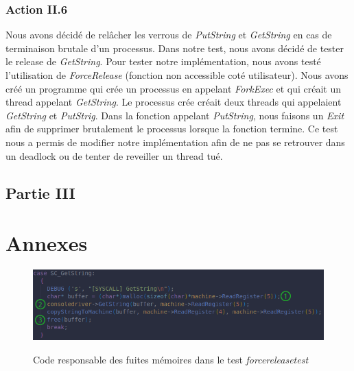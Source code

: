 \documentclass{article}
\begin{document}
\subsubsection{Action II.6}
Nous avons décidé de relâcher les verrous de \textit{PutString} et \textit{GetString} en cas de terminaison brutale d'un processus.
Dans notre test, nous avons décidé de tester le release de  \textit{GetString}.
Pour tester notre implémentation, nous avons testé l'utilisation de \textit{ForceRelease} (fonction non accessible coté utilisateur).
Nous avons créé un programme qui crée un processus en appelant \textit{ForkExec} et qui créait un thread appelant  \textit{GetString}.
Le processus crée créait deux threads qui appelaient  \textit{GetString} et  \textit{PutStrig}. Dans la fonction appelant \textit{PutString},
nous faisons un \textit{Exit} afin de supprimer brutalement le processus lorsque la fonction termine. Ce test nous a permis de modifier notre 
implémentation afin de ne pas se retrouver dans un deadlock ou de tenter de reveiller un thread tué.

\subsection{Partie III}

\section{Annexes}
\begin{figure}[h]
    \caption{Code responsable des fuites mémoires dans le test \textit{forcereleasetest}}
    \centering
    \includegraphics[width=\textwidth,height=\textheight,keepaspectratio]{Leak}
    \label{fig:fuites}
\end{figure}
\end{document}
